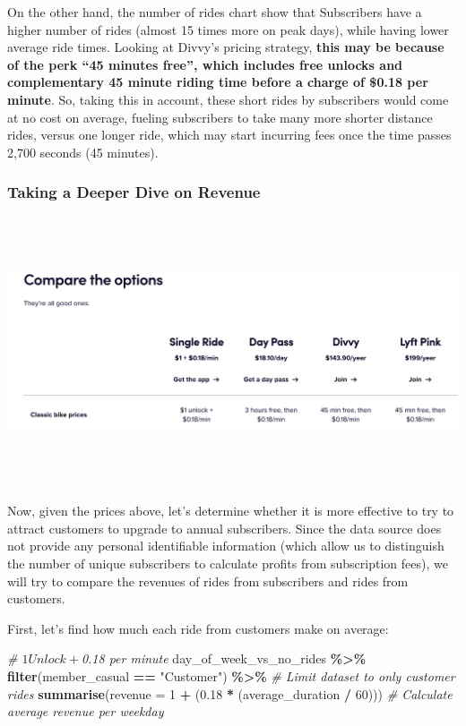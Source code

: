 \documentclass[
]{article}
\newenvironment{Shaded}{\begin{snugshade}}{\end{snugshade}}
\newcommand{\AttributeTok}[1]{\textcolor[rgb]{0.13,0.29,0.53}{#1}}
\newcommand{\CommentTok}[1]{\textcolor[rgb]{0.56,0.35,0.01}{\textit{#1}}}
\newcommand{\DecValTok}[1]{\textcolor[rgb]{0.00,0.00,0.81}{#1}}
\newcommand{\FloatTok}[1]{\textcolor[rgb]{0.00,0.00,0.81}{#1}}
\newcommand{\FunctionTok}[1]{\textcolor[rgb]{0.13,0.29,0.53}{\textbf{#1}}}
\newcommand{\NormalTok}[1]{#1}
\newcommand{\SpecialCharTok}[1]{\textcolor[rgb]{0.81,0.36,0.00}{\textbf{#1}}}
\newcommand{\StringTok}[1]{\textcolor[rgb]{0.31,0.60,0.02}{#1}}
\begin{document}
On the other hand, the number of rides chart show that Subscribers have
a higher number of rides (almost 15 times more on peak days), while
having lower average ride times. Looking at Divvy's pricing strategy,
\textbf{this may be because of the perk ``45 minutes free'', which
includes free unlocks and complementary 45 minute riding time before a
charge of \$0.18 per minute}. So, taking this in account, these short
rides by subscribers would come at no cost on average, fueling
subscribers to take many more shorter distance rides, versus one longer
ride, which may start incurring fees once the time passes 2,700 seconds
(45 minutes).

\subsubsection{Taking a Deeper Dive on
Revenue}\label{taking-a-deeper-dive-on-revenue}

\includegraphics[width=1500px,height=300px]{Divvy Pricing}

Now, given the prices above, let's determine whether it is more
effective to try to attract customers to upgrade to annual subscribers.
Since the data source does not provide any personal identifiable
information (which allow us to distinguish the number of unique
subscribers to calculate profits from subscription fees), we will try to
compare the revenues of rides from subscribers and rides from customers.

First, let's find how much each ride from customers make on average:

\begin{Shaded}
\begin{Highlighting}[]
\CommentTok{\# $1 Unlock + $0.18 per minute}
\NormalTok{day\_of\_week\_vs\_no\_rides }\SpecialCharTok{\%\textgreater{}\%} 
  \FunctionTok{filter}\NormalTok{(member\_casual }\SpecialCharTok{==} \StringTok{"Customer"}\NormalTok{) }\SpecialCharTok{\%\textgreater{}\%} \CommentTok{\# Limit dataset to only customer rides}
  \FunctionTok{summarise}\NormalTok{(}\AttributeTok{revenue =} \DecValTok{1} \SpecialCharTok{+}\NormalTok{ (}\FloatTok{0.18} \SpecialCharTok{*}\NormalTok{ (average\_duration }\SpecialCharTok{/} \DecValTok{60}\NormalTok{))) }\CommentTok{\# Calculate average revenue per weekday}
\end{Highlighting}
\end{Shaded}
\end{document}
